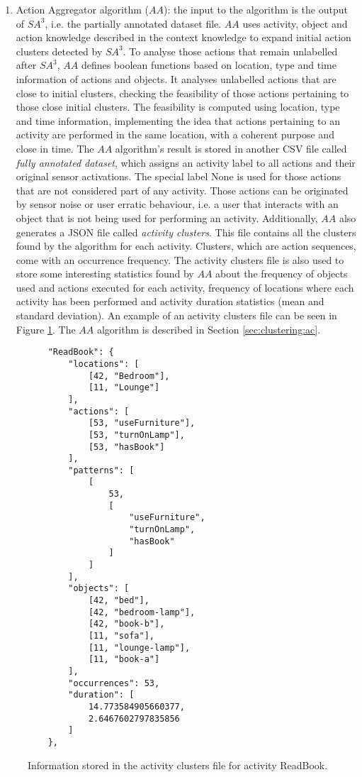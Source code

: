 \begin{enumerate}
 \item Action Aggregator algorithm ($AA$): the input to the algorithm is the output of $SA^3$, i.e. the partially annotated dataset file. $AA$ uses activity, object and action knowledge described in the context knowledge to expand initial action clusters detected by $SA^3$. To analyse those actions that remain unlabelled after $SA^3$, $AA$ defines boolean functions based on location, type and time information of actions and objects. It analyses unlabelled actions that are close to initial clusters, checking the feasibility of those actions pertaining to those close initial clusters. The feasibility is computed using location, type and time information, implementing the idea that actions pertaining to an activity are performed in the same location, with a coherent purpose and close in time. The $AA$ algorithm's result is stored in another CSV file called \textit{fully annotated dataset}, which assigns an activity label to all actions and their original sensor activations. The special label None is used for those actions that are not considered part of any activity. Those actions can be originated by sensor noise or user erratic behaviour, i.e. a user that interacts with an object that is not being used for performing an activity. Additionally, $AA$ also generates a JSON file called \textit{activity clusters}. This file contains all the clusters found by the algorithm for each activity. Clusters, which are action sequences, come with an occurrence frequency. The activity clusters file is also used to store some interesting statistics found by $AA$ about the frequency of objects used and actions executed for each activity, frequency of locations where each activity has been performed and activity duration statistics (mean and standard deviation). An example of an activity clusters file can be seen in Figure \ref{fig-clusters-file}. The $AA$ algorithm is described in Section \ref{sec:clustering:ac}.
\end{enumerate}

\begin{figure}[htbp]
\begin{small}
\begin{lstlisting}
    "ReadBook": {
        "locations": [
            [42, "Bedroom"], 
            [11, "Lounge"]
        ], 
        "actions": [
            [53, "useFurniture"], 
            [53, "turnOnLamp"], 
            [53, "hasBook"]
        ], 
        "patterns": [
            [
                53, 
                [
                    "useFurniture", 
                    "turnOnLamp", 
                    "hasBook"
                ]
            ]
        ], 
        "objects": [
            [42, "bed"], 
            [42, "bedroom-lamp"], 
            [42, "book-b"], 
            [11, "sofa"], 
            [11, "lounge-lamp"], 
            [11, "book-a"]
        ], 
        "occurrences": 53, 
        "duration": [
            14.773584905660377, 
            2.6467602797835856
        ]
    }, 
\end{lstlisting}
\end{small}
\caption{Information stored in the activity clusters file for activity ReadBook.}
\label{fig-clusters-file}
\end{figure}

